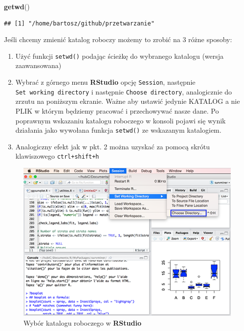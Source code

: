 \documentclass[]{book}
\newenvironment{Shaded}{\begin{snugshade}}{\end{snugshade}}
\newcommand{\KeywordTok}[1]{\textcolor[rgb]{0.13,0.29,0.53}{\textbf{#1}}}
\newcommand{\NormalTok}[1]{#1}
\theoremstyle{definition}
\theoremstyle{definition}
\theoremstyle{definition}
\theoremstyle{remark}
\begin{document}
\begin{Shaded}
\begin{Highlighting}[]
\KeywordTok{getwd}\NormalTok{()}
\end{Highlighting}
\end{Shaded}

\begin{verbatim}
## [1] "/home/bartosz/github/przetwarzanie"
\end{verbatim}

Jeśli chcemy zmienić katalog roboczy możemy to zrobić na 3 różne
sposoby:

\begin{enumerate}
\def\labelenumi{\arabic{enumi}.}
\item
  Użyć funkcji \texttt{setwd()} podając ścieżkę do wybranego katalogu
  (wersja zaawansowana)
\item
  Wybrać z górnego menu \textbf{RStudio} opcję \texttt{Session},
  następnie \texttt{Set\ working\ directory} i następnie
  \texttt{Choose\ directory}, analogicznie do zrzutu na poniższym
  ekranie. Ważne aby ustawić jedynie KATALOG a nie PLIK w którym
  będziemy pracować i przechowywać nasze dane. Po poprawnym wskazaniu
  katalogu roboczego w konsoli pojawi się wynik działania jako wywołana
  funkcja \texttt{setwd()} ze wskazanym katalogiem.
\item
  Analogiczny efekt jak w pkt. 2 można uzyskać za pomocą skrótu
  klawiszowego \texttt{ctrl+shift+h}
\end{enumerate}

\begin{figure}
\centering
\includegraphics{figures/rstudio_setwd.png}
\caption{Wybór katalogu roboczego w \textbf{RStudio}}
\end{figure}
\end{document}

